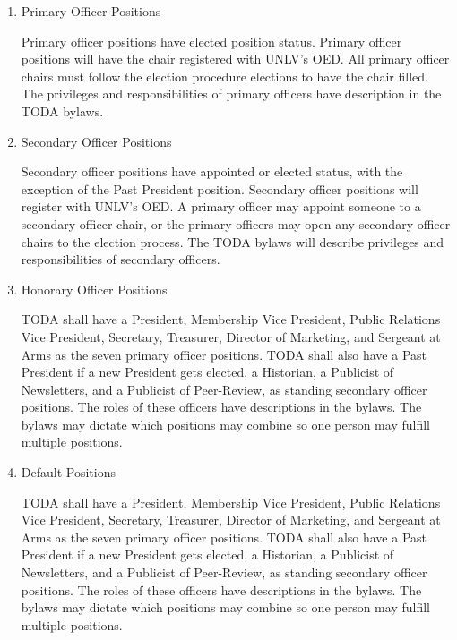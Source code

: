 \documentclass[11pt]{article}
\begin{document}
\begin{enumerate}
\item Primary Officer Positions
\label{sec:org5ce6a65}

Primary officer positions have elected position status. 
Primary officer positions will have the chair registered with UNLV’s OED. 
All primary officer chairs must follow the election procedure elections to have the chair filled. 
The privileges and responsibilities of primary officers have description in the TODA bylaws.

\item Secondary Officer Positions
\label{sec:orgc362f0f}

Secondary officer positions have appointed or elected status, with the exception of the Past President position. 
Secondary officer positions will register with UNLV’s OED. 
A primary officer may appoint someone to a secondary officer chair, or the primary officers may open any secondary officer chairs to the election process. 
The TODA bylaws will describe privileges and responsibilities of secondary officers.

\item Honorary Officer Positions
\label{sec:org40e41dc}

TODA shall have a President, Membership Vice President, Public Relations Vice President, Secretary, Treasurer, Director of Marketing, and Sergeant at Arms as the seven primary officer positions. 
TODA shall also have a Past President if a new President gets elected, a Historian, a Publicist of Newsletters, and a Publicist of Peer-Review, as standing secondary officer positions. 
The roles of these officers have descriptions in the bylaws. 
The bylaws may dictate which positions may combine so one person may fulfill multiple positions.

\item Default Positions
\label{sec:org08a83f4}

TODA shall have a President, Membership Vice President, Public Relations Vice President, Secretary, Treasurer, Director of Marketing, and Sergeant at Arms as the seven primary officer positions. 
TODA shall also have a Past President if a new President gets elected, a Historian, a Publicist of Newsletters, and a Publicist of Peer-Review, as standing secondary officer positions. 
The roles of these officers have descriptions in the bylaws. 
The bylaws may dictate which positions may combine so one person may fulfill multiple positions.
\end{enumerate}
\end{document}
